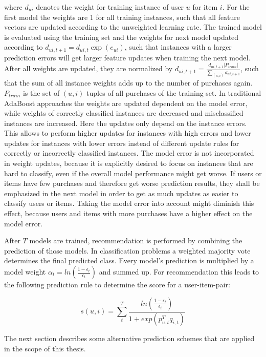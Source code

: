 \documentclass[10pt]{reportMaster}
\begin{document}
where $d_{ui}$ denotes the weight for training instance of user $u$ for item $i$.
For the first model the weights are $1$ for all training instances, such that all feature vectors are updated according to the unweighted learning rate.
The trained model is evaluated using the training set and the weights for next model updated according to $d_{ui,t+1} = d_{ui,t} \exp(e_{ui})$, such that instances with a larger prediction errors will get larger feature updates when training the next model.
After all weights are updated, they are normalized by $d_{ui,t+1} = \frac{d_{ui,t+1} |P_{train}|}{\sum_{(u,i)}{d_{ui,t+1}}}$, such that the sum of all instance weights adds up to the number of purchases again.
$P_{train}$ is the set of $(u,i)$ tuples of all purchases of the training set.
In traditional AdaBoost approaches the weights are updated dependent on the model error, while weights of correctly classified instances are decreased and misclassified instances are increased.
Here the updates only depend on the instance errors.
This allows to perform higher updates for instances with high errors and lower updates for instances with lower errors instead of different update rules for correctly or incorrectly classified instances. 
The model error is not incorporated in weight updates, because it is explicitly desired to focus on instances that are hard to classify, even if the overall model performance might get worse.
If users or items have few purchases and therefore get worse prediction results, they shall be emphasized in the next model in order to get as much updates as easier to classify users or items.
Taking the model error into account might diminish this effect, because users and items with more purchases have a higher effect on the model error.

After $T$ models are trained, recommendation is performed by combining the prediction of those models.
In classification problems a weighted majority vote determines the final predicted class.
Every model's prediction is multiplied by a model weight $\alpha_t = ln(\frac{1-\epsilon_t}{\epsilon_t})$ and summed up.
For recommendation this leads to the following prediction rule to determine the score for a user-item-pair:

\begin{equation}
	\label{eq:adaBoostPredRule}
	s(u,i) = \sum_t^T{\frac{ln(\frac{1 - \epsilon_t}{\epsilon_t})}{1 + exp(p_{u,t}^Tq_{i,t})}}
\end{equation}

The next section describes some alternative prediction schemes that are applied in the scope of this thesis.
\end{document}
